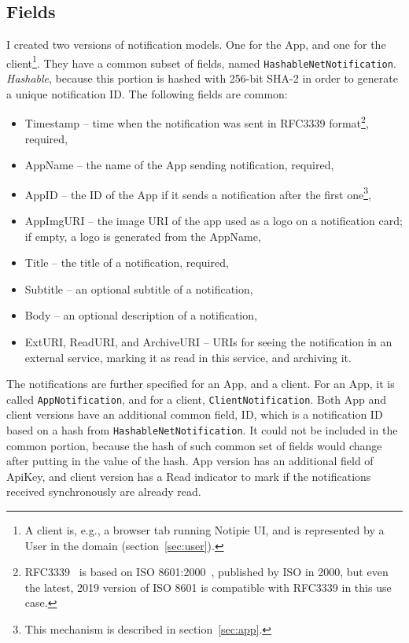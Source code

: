 \subsection{Fields}\label{sec:protocol-fields}

I created two versions of notification models.
One for the App,
and one for the client\footnote{
  A client is, e.g.,
  a browser tab running Notipie \ac{UI},
  and is represented
  by a User in the domain (section~\ref{sec:user}).
}.
They have a common subset of fields,
named \texttt{HashableNetNotification}.
\textit{Hashable},
because this portion is hashed with 256-bit \ac{SHA-2}
in order to generate a unique notification \ac{ID}.
The following fields are common:

\begin{itemize}
  \item Timestamp -- time when the notification was sent
        in RFC3339 format\footnote{
          RFC3339~\cite{clyne_rfc3339_2002} is based on
          ISO 8601:2000~\cite{international_organization_for_standardization_iso_2000},
          published by \ac{ISO} in 2000,
          but even the latest, 2019 version of ISO 8601
          is compatible with RFC3339 in this use case.
        }, required,
  \item AppName -- the name of the App sending notification, required,
  \item AppID -- the \ac{ID} of the App
        if it sends a notification after the first one\footnote{
          This mechanism is described in section~\ref{sec:app}.
        },
  \item AppImgURI -- the image \ac{URI} of the app
        used as a logo on a notification card;
        if empty, a logo is generated from the AppName,
  \item Title -- the title of a notification, required,
  \item Subtitle -- an optional subtitle of a notification,
  \item Body -- an optional description of a notification,
  \item ExtURI, ReadURI, and ArchiveURI -- \acp{URI}
        for seeing the notification in an external service,
        marking it as read in this service, and archiving it.
\end{itemize}

The notifications are further specified
for an App, and a client.
For an App, it is called \texttt{AppNotification},
and for a client, \texttt{ClientNotification}.
Both App and client versions
have an additional common field, \ac{ID},
which is a notification \ac{ID}
based on a hash from \texttt{HashableNetNotification}.
It could not be included in the common portion,
because the hash of such common set of fields
would change after putting in the value of the hash.
App version has an additional field of ApiKey,
and client version has a Read indicator
to mark if the notifications received
synchronously are already read.
